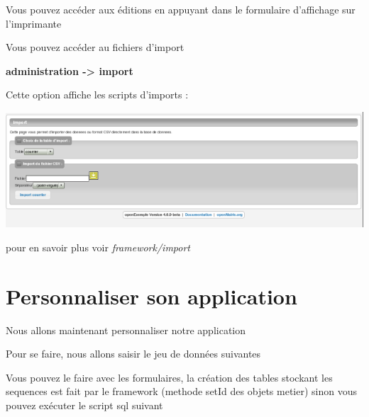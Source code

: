 \documentclass[letterpaper,10pt,french]{manual}
\begin{document}
Vous pouvez accéder aux éditions en appuyant dans le formulaire d'affichage sur l'imprimante

Vous pouvez accéder au fichiers d'import

\textbf{administration -\textgreater{} import}

Cette option affiche les scripts d'imports :

\includegraphics{utilisation_11.png}

pour en savoir plus voir \emph{framework/import}

\resetcurrentobjects
\hypertarget{--doc-utilisation/personnaliser}{}

\hypertarget{personnaliser}{}\section{Personnaliser son application}

Nous allons maintenant personnaliser notre application

Pour se faire, nous allons saisir le jeu de données suivantes

Vous pouvez le faire avec les formulaires, la création des tables stockant les
sequences est fait par le framework (methode setId des objets metier)  sinon vous pouvez exécuter
le script sql suivant
\end{document}
